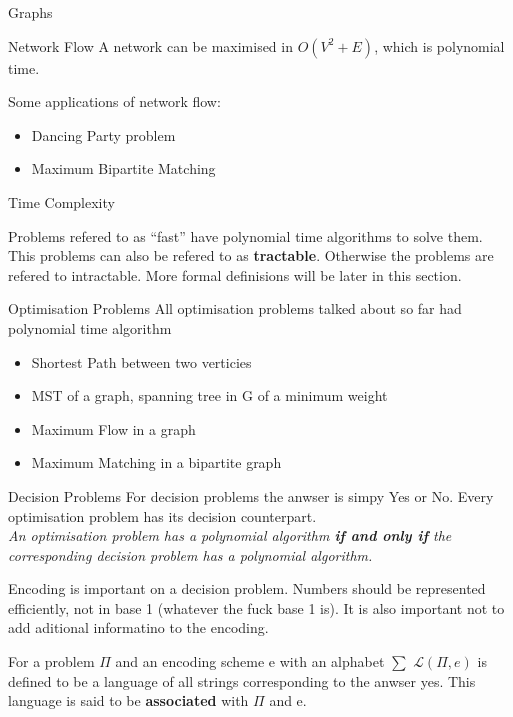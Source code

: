 \documentclass[12pt, letterpaper]{article}
\begin{document}
\begin{section}{Graphs}
\begin{subsection}{Network Flow}
    A network can be maximised in \(O(V^{2} + E)\), which is polynomial time.

    Some applications of network flow:
    \begin{itemize}
      \item Dancing Party problem
      \item Maximum Bipartite Matching
    \end{itemize}
  \end{subsection}

\end{section}

\begin{section}{Time Complexity}

  Problems refered to as ``fast'' have polynomial time algorithms to solve them.
  This problems can also be refered to as \textbf{tractable}. Otherwise the
  problems are refered to intractable. More formal definisions will be later
  in this section.

  \begin{subsection}{Optimisation Problems}
    All optimisation problems talked about so far had polynomial time algorithm
    \begin{itemize}
      \item Shortest Path between two verticies
      \item MST of a graph, spanning tree in G of a minimum weight
      \item Maximum Flow in a graph
      \item Maximum Matching in a bipartite graph
    \end{itemize}
  \end{subsection}

  \begin{subsection}{Decision Problems}
    For decision problems the anwser is simpy Yes or No. Every optimisation
    problem has its decision counterpart. \\
    \emph{An optimisation problem has a polynomial algorithm \textbf{if and only if}
      the corresponding decision problem has a polynomial algorithm.}

    Encoding is important on a decision problem. Numbers should be represented
    efficiently, not in base 1 (whatever the fuck base 1 is). It is also
    important not to add aditional informatino to the encoding.

    For a problem \(\Pi\) and an encoding scheme e with an alphabet \(\sum\)
    \(\mathscr{L}(\Pi, e)\) is defined to be a language of all strings corresponding
    to the anwser yes. This language is said to be \textbf{associated} with \(\Pi\) and e.


\end{subsection}
\end{section}
\end{document}
